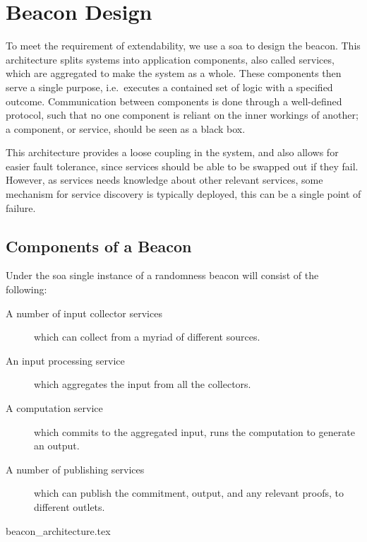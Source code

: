 \section{Beacon Design}

To meet the requirement of extendability, we use a \gls{soa} to design the beacon.
This architecture splits systems into application components, also called services, which are aggregated to make the system as a whole.
These components then serve a single purpose, i.e.\ executes a contained set of logic with a specified outcome.
Communication between components is done through a well-defined protocol, such that no one component is reliant on the inner workings of another;
a component, or service, should be seen as a black box.

This architecture provides a loose coupling in the system, and also allows for easier fault tolerance, since services should be able to be swapped out if they fail.
However, as services needs knowledge about other relevant services, some mechanism for service discovery is typically deployed, this can be a single point of failure.

\subsection{Components of a Beacon}
\label{sub:components_of_a_beacon}
Under the \gls{soa} single instance of a randomness beacon will consist of the following:
\begin{description}
    \item[A number of input collector services] which can collect from a myriad of different sources.
    \item[An input processing service] which aggregates the input from all the collectors.
    \item[A computation service] which commits to the aggregated input, runs the computation to generate an output.
    \item[A number of publishing services] which can publish the commitment, output, and any relevant proofs, to different outlets.
\end{description}

{beacon_architecture.tex}

